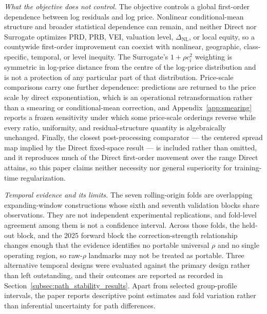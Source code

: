 \documentclass[10pt]{article}
\theoremstyle{definition}
\newcommand{\1}{\mathbf{1}}
\begin{document}
\emph{What the objective does not control.} The objective controls a global first-order
dependence between log residuals and log price. Nonlinear conditional-mean structure and broader
statistical dependence can remain, and neither Direct nor Surrogate optimizes PRD, PRB, VEI,
valuation level, $\Delta_{\mathrm{NL}}$, or local equity, so a countywide first-order improvement
can coexist with nonlinear, geographic, class-specific, temporal, or level inequity. The Surrogate's
$1+\rho c_i^2$ weighting is symmetric in log-price distance from the centre of the log-price
distribution and is not a protection of any particular part of that distribution. Price-scale
comparisons carry one further dependence: predictions are returned to the price scale by direct
exponentiation, which is an operational retransformation rather than a smearing or conditional-mean
correction, and Appendix~\ref{app:smearing} reports a frozen sensitivity under which some
price-scale orderings reverse while every ratio, uniformity, and residual-structure quantity is
algebraically unchanged. Finally, the closest post-processing comparator --- the centered spread map
implied by the Direct fixed-space result --- is included rather than omitted, and it reproduces much
of the Direct first-order movement over the range Direct attains, so this paper claims neither
necessity nor general superiority for training-time regularization.

\emph{Temporal evidence and its limits.} The seven rolling-origin folds are overlapping
expanding-window constructions whose sixth and seventh validation blocks share observations. They
are not independent experimental replications, and fold-level agreement among them is not a
confidence interval. Across those folds, the held-out block, and the 2025 forward block the
correction-strength relationship changes enough that the evidence identifies no portable universal
$\rho$ and no single operating region, so raw-$\rho$ landmarks may not be treated as portable.
Three alternative temporal designs were evaluated against the primary design rather than left
outstanding, and their outcomes are reported as recorded in
Section~\ref{subsec:path_stability_results}. Apart from selected group-profile intervals, the paper
reports descriptive point estimates and fold variation rather than inferential uncertainty for path
differences.
\end{document}
